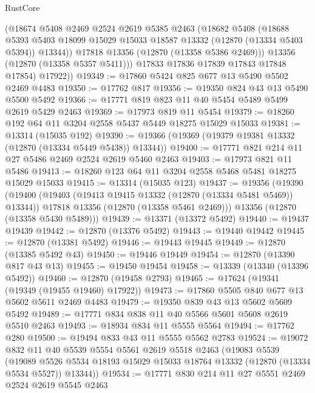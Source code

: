\begin{lexlean}{RustCore}
\begin{coremodule}
            (@18674
              @5408
              @2469
              @2524
              @2619
              @5385
              @2463
              (@18682
                @5408
                (@18688
                  @5393
                  @5403
                  @18099
                  @15029
                  @15033
                  @18587
                  @13332
                  (@12870 (@13334 @5403 @5394))
                  @13344))
              @17818
              @13356
              (@12870 (@13358 @5386 @2469)))
            @13356
            (@12870 (@13358 @5357 @5411)))
          @17833
          @17836
          @17839
          @17843
          @17848
          @17854)
        @17922))
@19349 := @17860 @5424 @825 @677 @13 @5490 @5502 @2469 @4483
@19350 := @17762 @817
@19356 := @19350 @824 @43 @13 @5490 @5500 @5492
@19366 := @17771 @819 @823 @11 @40 @5454 @5489 @5499 @2619 @5429 @2463
@19369 := @17973 @819 @11 @5454
@19379 := @18260 @192 @64 @11 @3204 @2558 @5437 @5449 @18275 @15029 @15033
@19381 := @13314 (@15035 @192)
@19390 := @19366 (@19369 (@19379 @19381 @13332 (@12870 (@13334 @5449 @5438)) @13344))
@19400 := @17771 @821 @214 @11 @27 @5486 @2469 @2524 @2619 @5460 @2463
@19403 := @17973 @821 @11 @5486
@19413 := @18260 @123 @64 @11 @3204 @2558 @5468 @5481 @18275 @15029 @15033
@19415 := @13314 (@15035 @123)
@19437 := @19356
    (@19390
      (@19400
        (@19403 (@19413 @19415 @13332 (@12870 (@13334 @5481 @5469)) @13344))
        @17818
        @13356
        (@12870 (@13358 @5461 @2469)))
      @13356
      (@12870 (@13358 @5430 @5489)))
@19439 := @13371 (@13372 @5492)
@19440 := @19437 @19439
@19442 := @12870 (@13376 @5492)
@19443 := @19440 @19442
@19445 := @12870 (@13381 @5492)
@19446 := @19443 @19445
@19449 := @12870 (@13385 @5492 @43)
@19450 := @19446 @19449
@19454 := @12870 (@13390 @817 @43 @13)
@19455 := @19450 @19454
@19458 := @13339 (@13340 (@13396 @5492))
@19460 := @12870 (@19458 @2793)
@19465 := @17624 (@19341 (@19349 (@19455 @19460) @17922))
@19473 := @17860 @5505 @840 @677 @13 @5602 @5611 @2469 @4483
@19479 := @19350 @839 @43 @13 @5602 @5609 @5492
@19489 := @17771 @834 @838 @11 @40 @5566 @5601 @5608 @2619 @5510 @2463
@19493 := @18934 @834 @11 @5555 @5564
@19494 := @17762 @280
@19500 := @19494 @833 @43 @11 @5555 @5562 @2783
@19524 := @19072
    @832
    @11
    @40
    @5539
    @5554
    @5561
    @2619
    @5518
    @2463
    (@19083
      @5539
      (@19089 @5526 @5534 @18193 @15029 @15033 @18764 @13332 (@12870 (@13334 @5534 @5527)) @13344))
@19534 := @17771 @830 @214 @11 @27 @5551 @2469 @2524 @2619 @5545 @2463

\end{coremodule}
\end{lexlean}
